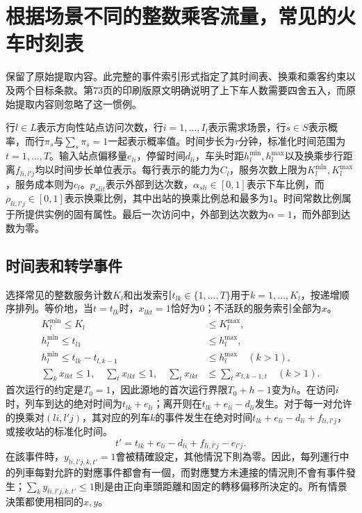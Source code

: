 \documentclass{article}
\begin{document}
\section*{根据场景不同的整数乘客流量，常见的火车时刻表}
保留了原始提取内容。此完整的事件索引形式指定了其时间表、换乘和乘客约束以及两个目标条款。第73页的印刷版原文明确说明了上下车人数需要四舍五入，而原始提取内容则忽略了这一惯例。

行$l\in L$表示方向性站点访问次数，行$i=1,\ldots,I_l$表示需求场景，行$s\in S$表示概率，而行$\pi_s$与$\sum_s\pi_s=1$一起表示概率值。时间步长为$\tau$分钟，标准化时间范围为$t=1,\ldots,T$。输入站点偏移量$e_{li}$，停留时间$d_{li}$，车头时距$h_l^{\min},h_l^{\max}$以及换乘步行距离$f_{li,l'j}$均以时间步长单位表示。每行表示的能力为$C_l$，服务次数上限为$K_l^{\min},K_l^{\max}$，服务成本则为$c_l$。$p_{slit}$表示外部到达次数，$\alpha_{sli}\in[0,1]$表示下车比例，而$\rho_{li,l'j}\in[0,1]$表示换乘比例，其中出站的换乘比例总和最多为1。时间常数比例属于所提供实例的固有属性。最后一次访问中，外部到达次数为$\alpha=1$，而外部到达数为零。

\subsection*{时间表和转学事件}
选择常见的整数服务计数$K_l$和出发索引$t_{lk}\in\{1,\ldots,T\}$用于$k=1,\ldots,K_l$，按递增顺序排列。等价地，当$t=t_{lk}$时，$x_{lkt}=1$恰好为0；不活跃的服务索引全部为$x$。
\begin{align}
K_l^{\min}\le K_l&\le K_l^{\max},\\
h_l^{\min}\le t_{l1}&\le h_l^{\max},\\
h_l^{\min}\le t_{lk}-t_{l,k-1}&\le h_l^{\max}\quad(k>1),\\
\sum_kx_{lkt}\le1,\quad \sum_tx_{lkt}\le1,\quad
\sum_tx_{lkt}&\le\sum_tx_{l,k-1,t}\quad(k>1).
\end{align}
首次运行的约定是$T_0=1$，因此源地的首次运行界限$T_0+h-1$变为$h$。在访问$i$时，列车到达的绝对时间为$t_{lk}+e_{li}$；离开则在$t_{lk}+e_{li}-d_{li}$发生。对于每一对允许的换乘对$(li,l'j)$，其对应的列车$k$的事件发生在绝对时间$t_{lk}+e_{li}-d_{li}+f_{li,l'j}$，或接收站的标准化时间。
\[
t'=t_{lk}+e_{li}-d_{li}+f_{li,l'j}-e_{l'j}.
\]
在該事件時，$y_{li,l'j,k,t'}=1$會被精確設定，其他情況下則為零。因此，每列運行中的列車每對允許的對應事件都會有一個，而對應雙方未連接的情況則不會有事件發生；$\sum_k y_{li,l'j,k,t'}\le1$則是由正向車頭距離和固定的轉移偏移所決定的。所有情景決策都使用相同的$x,y$。
\end{document}
